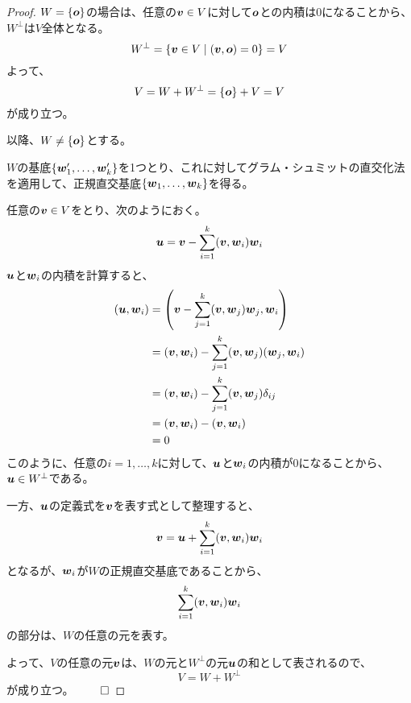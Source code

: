 \documentclass[../../../topic_linear-algebra]{subfiles}
\begin{document}
\begin{proof}
  $W = \{ \vb*{o} \}$の場合は、任意の$\vb*{v} \in V$に対して$\vb*{o}$との内積は0になることから、$W^\perp$は$V$全体となる。
  \begin{equation*}
    W^\perp = \{ \vb*{v} \in V \mid  (\vb*{v}, \vb*{o}) = 0 \} = V
  \end{equation*}
  よって、
  \begin{equation*}
    V = W + W^\perp = \{ \vb*{o} \} + V = V
  \end{equation*}
  が成り立つ。

  \br

  以降、$W \neq \{ \vb*{o} \}$とする。

  $W$の基底$\{ \vb*{w}'_1, \ldots, \vb*{w}'_k \}$を1つとり、これに対してグラム・シュミットの直交化法を適用して、正規直交基底$\{ \vb*{w}_1, \ldots, \vb*{w}_k \}$を得る。

  \br

  任意の$\vb*{v} \in V$をとり、次のようにおく。
  \begin{equation*}
    \vb*{u} = \vb*{v} - \sum_{i=1}^k (\vb*{v}, \vb*{w}_i) \vb*{w}_i
  \end{equation*}
  $\vb*{u}$と$\vb*{w}_i$の内積を計算すると、
  \begin{align*}
    (\vb*{u}, \vb*{w}_i) & = \left( \vb*{v} - \sum_{j=1}^k (\vb*{v}, \vb*{w}_j) \vb*{w}_j, \vb*{w}_i \right) \\
                         & = (\vb*{v}, \vb*{w}_i) - \sum_{j=1}^k (\vb*{v}, \vb*{w}_j) (\vb*{w}_j, \vb*{w}_i) \\
                         & = (\vb*{v}, \vb*{w}_i) - \sum_{j=1}^k (\vb*{v}, \vb*{w}_j) \delta_{ij}            \\
                         & = (\vb*{v}, \vb*{w}_i) - (\vb*{v}, \vb*{w}_i)                                     \\
                         & = 0
  \end{align*}
  このように、任意の$i = 1, \ldots, k$に対して、$\vb*{u}$と$\vb*{w}_i$の内積が0になることから、$\vb*{u} \in W^\perp$である。

  \br

  一方、$\vb*{u}$の定義式を$\vb*{v}$を表す式として整理すると、
  \begin{equation*}
    \vb*{v} = \vb*{u} + \sum_{i=1}^k (\vb*{v}, \vb*{w}_i) \vb*{w}_i
  \end{equation*}
  となるが、$\vb*{w}_i$が$W$の正規直交基底であることから、
  \begin{equation*}
    \sum_{i=1}^k (\vb*{v}, \vb*{w}_i) \vb*{w}_i
  \end{equation*}
  の部分は、$W$の任意の元を表す。

  \br

  よって、$V$の任意の元$\vb*{v}$は、$W$の元と$W^\perp$の元$\vb*{u}$の和として表されるので、
  \begin{equation*}
    V = W + W^\perp
  \end{equation*}
  が成り立つ。 $\qed$
\end{proof}
\end{document}

